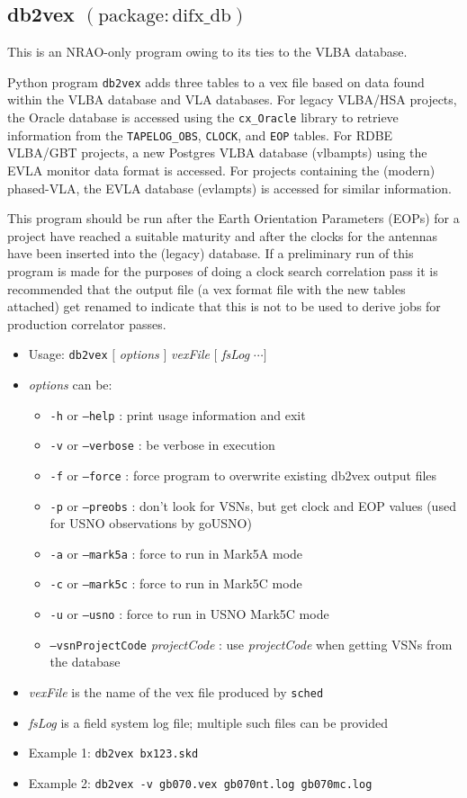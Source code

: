 \subsection{db2vex {\small $\mathrm{(package: difx\_db)}$}}

This is an NRAO-only program owing to its ties to the VLBA database.

Python program {\tt db2vex} adds three tables to a vex file based on data found within the VLBA database and VLA databases.
For legacy VLBA/HSA projects, the Oracle database is accessed using the {\tt cx\_Oracle} library to retrieve information from the {\tt TAPELOG\_OBS}, {\tt CLOCK}, and {\tt EOP} tables.
For RDBE VLBA/GBT projects, a new Postgres VLBA database (vlbampts) using the EVLA monitor data format is accessed.
For projects containing the (modern) phased-VLA, the EVLA database (evlampts) is accessed for similar information.

This program should be run after the Earth Orientation Parameters (EOPs) for a project have reached a suitable maturity and after the clocks for the antennas have been inserted into the (legacy) database.
If a preliminary run of this program is made for the purposes of doing a clock search correlation pass it is recommended that the output file (a vex format file with the new tables attached) get renamed to indicate that this is not to be used to derive jobs for production correlator passes.

\begin{itemize}
\item[] Usage: {\tt db2vex} $[$ {\em options} $]$ {\em vexFile} $[$ {\em fsLog} $\cdots ]$
\item[] {\em options} can be:
\begin{itemize}
\item[] {\tt -h} or {\tt --help} : print usage information and exit
\item[] {\tt -v} or {\tt --verbose} : be verbose in execution
\item[] {\tt -f} or {\tt --force} : force program to overwrite existing db2vex output files
\item[] {\tt -p} or {\tt --preobs} : don't look for VSNs, but get clock and EOP values (used for USNO observations by goUSNO)
\item[] {\tt -a} or {\tt --mark5a} : force to run in Mark5A mode
\item[] {\tt -c} or {\tt --mark5c} : force to run in Mark5C mode
\item[] {\tt -u} or {\tt --usno} : force to run in USNO Mark5C mode
\item[] {\tt --vsnProjectCode} {\em projectCode} : use {\em projectCode} when getting VSNs from the database
\end{itemize}
\item[] {\em vexFile} is the name of the vex file produced by {\tt sched}
\item[] {\em fsLog} is a field system log file; multiple such files can be provided
\item[] Example 1: {\tt db2vex bx123.skd}
\item[] Example 2: {\tt db2vex -v gb070.vex gb070nt.log gb070mc.log}
\end{itemize}

